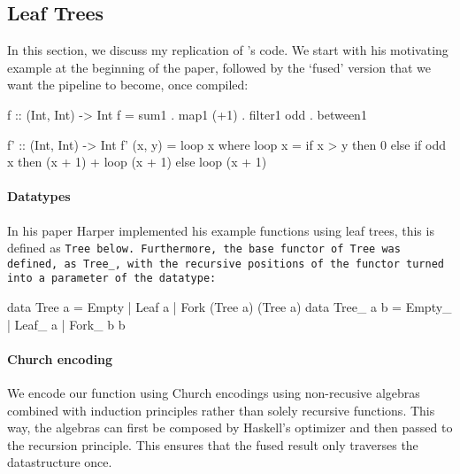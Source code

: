 \long{}
\subsection{Leaf Trees}
In this section, we discuss my replication of \cite{Harper2011}'s code.
We start with his motivating example at the beginning of the paper, followed by the `fused' version that we want the pipeline to become, once compiled:
\begin{code}
f :: (Int, Int) -> Int
f = sum1 . map1 (+1) . filter1 odd . between1

f' :: (Int, Int) -> Int
f' (x, y) = loop x
  where loop x = if x > y
                 then 0
                 else if odd x
                      then (x + 1) + loop (x + 1)
                      else loop (x + 1)
\end{code}
\paragraph{Datatypes} In his paper Harper implemented his example functions using leaf trees, this is defined as \tt{Tree} below.
Furthermore, the base functor of \tt{Tree} was defined, as \tt{Tree\_}, with the recursive positions of the functor turned into a parameter of the datatype:
\begin{code}
data Tree a = Empty | Leaf a | Fork (Tree a) (Tree a)
data Tree_ a b = Empty_ | Leaf_ a | Fork_ b b
\end{code}
\paragraph{Church encoding}
We encode our function using Church encodings using non-recusive algebras combined with induction principles rather than solely recursive functions.
This way, the algebras can first be composed by Haskell's optimizer and then passed to the recursion principle.
This ensures that the fused result only traverses the datastructure once.

